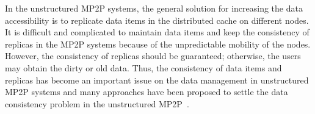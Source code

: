 In the unstructured MP2P systems, the general solution for increasing the data accessibility is to replicate data items in the distributed cache on different nodes. It is difficult and complicated to maintain data items and keep the consistency of replicas in the MP2P systems because of the unpredictable mobility of the nodes. However, the consistency of replicas should be guaranteed; otherwise, the users may obtain the dirty or old data. Thus, the consistency of data items and replicas has become an important issue on the data management in unstructured MP2P systems and many approaches have been proposed to settle the data consistency problem in the unstructured MP2P~\cite{springerlink:10.1007/s11277-006-9238-z}.
